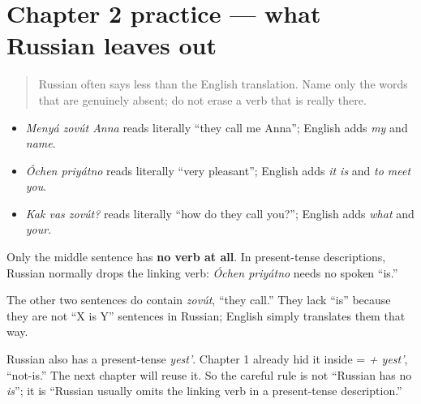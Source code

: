 \section[Practice]{Chapter 2 practice — what Russian leaves out}

\label{lesson:RU-C02-practice-zero-copula}



\begin{quote}
Russian often says less than the English translation. Name only the words that are genuinely absent; do not erase a verb that is really there.
\end{quote}

\begin{grammarlens}[title={Grammar lens — three phrases, three English expansions}]
\begin{itemize}
\raggedright
  \item \emph{Menyá zovút Anna} reads literally \textquotedblleft{}they call me Anna\textquotedblright{}; English adds \emph{my} and \emph{name}.
  \item \emph{Óchen priyátno} reads literally \textquotedblleft{}very pleasant\textquotedblright{}; English adds \emph{it is} and \emph{to meet you}.
  \item \emph{Kak vas zovút?} reads literally \textquotedblleft{}how do they call you?\textquotedblright{}; English adds \emph{what} and \emph{your}.
\end{itemize}

Only the middle sentence has \textbf{no verb at all}. In present-tense descriptions, Russian normally drops the linking verb: \emph{Óchen priyátno} needs no spoken \textquotedblleft{}is.\textquotedblright{}

The other two sentences do contain \emph{zovút}, \textquotedblleft{}they call.\textquotedblright{} They lack \textquotedblleft{}is\textquotedblright{} because they are not \textquotedblleft{}X is Y\textquotedblright{} sentences in Russian; English simply translates them that way.

Russian also has a present-tense \emph{yest'}. Chapter 1 already hid it inside \textbf{} = \emph{ + yest'}, \textquotedblleft{}not-is.\textquotedblright{} The next chapter will reuse it. So the careful rule is not \textquotedblleft{}Russian has no \emph{is}\textquotedblright{}; it is \textquotedblleft{}Russian usually omits the linking verb in a present-tense description.\textquotedblright{}
\end{grammarlens}

